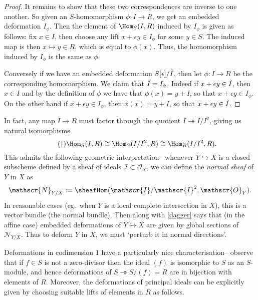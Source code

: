 \begin{theorem}
\begin{proof}
        It remains to show that these two correspondences are inverse to one another. So
        given an $S$-homomorphism $\phi:I\to R$, we get an embedded deformation
        $I_\phi$. Then the element of $\Hom_{S}(I,R)$ induced by $I_\phi$ is
        given as follows: fix $x\in I$, then choose any lift $x+\epsilon y\in
        I_\phi$ for some $y\in S$. The induced map is then $x\mapsto y\in R$,
        which is equal to $\phi(x)$. Thus, the homomorphism induced by $I_\phi$
        is the same as $\phi$.  

        Conversely if we have an embedded deformation $S[\epsilon]/\tilde{I}$, then
        let $\phi:I\to R$ be the corresponding homomorphism. We claim that
        $\tilde{I}=I_\phi$. Indeed if $x+\epsilon y\in\tilde{I}$, then $x\in I$ and by
        the definition of $\phi$ we have that $\phi(x)=y+I$, so that $x+\epsilon
        y\in I_\phi$. On the other hand if $x+\epsilon y\in I_\phi$, then
        $\phi(x)=y +I$, so that $x+\epsilon y\in \tilde{I}$.  
    \end{proof}
\end{theorem}

\begin{remark}
    In fact, any map \(I\rightarrow R\) must factor through the quotient
    \(I\twoheadrightarrow I/I^2\), giving us natural isomorphisms
    \begin{equation} 
        \tag{\(\dagger\)} \label{dagger} \Hom_S(I, R) \cong \Hom_S(I/I^2,
        R)\cong \Hom_R(I/I^2, R).  
    \end{equation} 
    This admits the following geometric interpretation-- whenever
    \(Y\hookrightarrow X\) is a closed subscheme defined by a sheaf of ideals
    \(\mathscr{I}\subset \mathscr{O}_X\), we can define the \textit{normal
    sheaf} of \(Y\) in \(X\) as \[\mathscr{N}_{Y/X} :=
    \sheafHom(\mathscr{I}/\mathscr{I}^2, \mathscr{O}_Y).\] In reasonable cases
    (eg.\ when \(Y\) is a local complete intersection in \(X\)), this is a
    vector bundle (the normal bundle). Then  along with
    \eqref{dagger} says that (in the affine case) embedded deformations of
    \(Y\hookrightarrow X\) are given by global sections of
    \(\mathscr{N}_{Y/X}\).  Thus to deform \(Y\) in \(X\), we must `perturb it
    in normal directions'.  
\end{remark}

Deformations in codimension \(1\) have a particularly nice characterisation--
observe that if \(f\in S\) is not a zero-divisor then the ideal \((f)\) is
isomorphic to \(S\) as an \(S\)-module, and hence deformations of
\(S\twoheadrightarrow S/(f)=R\) are in bijection with elements of \(R\).
Moreover, the deformations of principal ideals can be explicitly given by
choosing suitable lifts of elements in \(R\) as follows.

